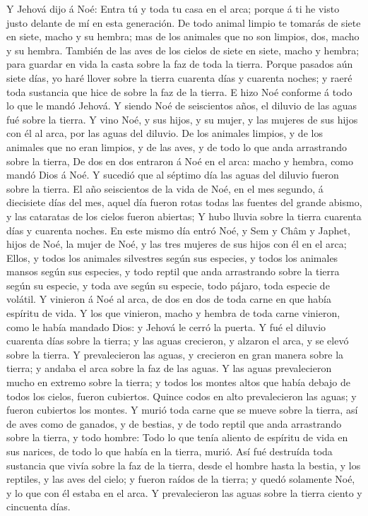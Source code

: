  Y Jehová dijo á Noé: Entra tú y toda tu casa en el arca;
porque á ti he visto justo delante de mí en esta generación.
 De todo animal limpio te tomarás de siete en siete, macho
y su hembra; mas de los animales que no son limpios, dos, macho y su
hembra.  También de las aves de los cielos de siete en
siete, macho y hembra; para guardar en vida la casta sobre la faz de
toda la tierra.  Porque pasados aún siete días, yo haré
llover sobre la tierra cuarenta días y cuarenta noches; y raeré toda
sustancia que hice de sobre la faz de la tierra.  E hizo
Noé conforme á todo lo que le mandó Jehová.  Y siendo Noé
de seiscientos años, el diluvio de las aguas fué sobre la tierra.
 Y vino Noé, y sus hijos, y su mujer, y las mujeres de sus
hijos con él al arca, por las aguas del diluvio.  De los
animales limpios, y de los animales que no eran limpios, y de las aves,
y de todo lo que anda arrastrando sobre la tierra,  De dos
en dos entraron á Noé en el arca: macho y hembra, como mandó Dios á Noé.
 Y sucedió que al séptimo día las aguas del diluvio
fueron sobre la tierra.  El año seiscientos de la vida de
Noé, en el mes segundo, á diecisiete días del mes, aquel día fueron
rotas todas las fuentes del grande abismo, y las cataratas de los cielos
fueron abiertas;  Y hubo lluvia sobre la tierra cuarenta
días y cuarenta noches.  En este mismo día entró Noé, y
Sem y Châm y Japhet, hijos de Noé, la mujer de Noé, y las tres mujeres
de sus hijos con él en el arca;  Ellos, y todos los
animales silvestres según sus especies, y todos los animales mansos
según sus especies, y todo reptil que anda arrastrando sobre la tierra
según su especie, y toda ave según su especie, todo pájaro, toda especie
de volátil.  Y vinieron á Noé al arca, de dos en dos de
toda carne en que había espíritu de vida.  Y los que
vinieron, macho y hembra de toda carne vinieron, como le había mandado
Dios: y Jehová le cerró la puerta.  Y fué el diluvio
cuarenta días sobre la tierra; y las aguas crecieron, y alzaron el arca,
y se elevó sobre la tierra.  Y prevalecieron las aguas, y
crecieron en gran manera sobre la tierra; y andaba el arca sobre la faz
de las aguas.  Y las aguas prevalecieron mucho en extremo
sobre la tierra; y todos los montes altos que había debajo de todos los
cielos, fueron cubiertos.  Quince codos en alto
prevalecieron las aguas; y fueron cubiertos los montes. 
Y murió toda carne que se mueve sobre la tierra, así de aves como de
ganados, y de bestias, y de todo reptil que anda arrastrando sobre la
tierra, y todo hombre:  Todo lo que tenía aliento de
espíritu de vida en sus narices, de todo lo que había en la tierra,
murió.  Así fué destruída toda sustancia que vivía sobre
la faz de la tierra, desde el hombre hasta la bestia, y los reptiles, y
las aves del cielo; y fueron raídos de la tierra; y quedó solamente Noé,
y lo que con él estaba en el arca.  Y prevalecieron las
aguas sobre la tierra ciento y cincuenta días.

